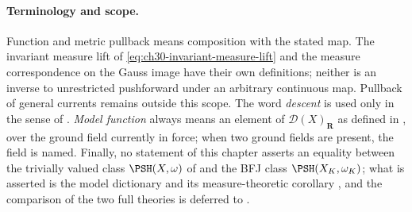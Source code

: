 \paragraph{Terminology and scope.}
Function and metric pullback means composition with the stated map.
The invariant measure lift of \eqref{eq:ch30-invariant-measure-lift}
and the measure correspondence on the Gauss image have their own
definitions; neither is an inverse to unrestricted pushforward under
an arbitrary continuous map.  Pullback of general currents remains
outside this scope.  The word \emph{descent} is used only in the sense of
.  \emph{Model function} always means an
element of $\mathcal D(X)_{\mathbf R}$ as defined in
, over the ground field currently in force;
when two ground fields are present, the field is named.  Finally, no
statement of this chapter asserts an equality between the trivially valued
class $\PSH(X,\omega)$ of  and the BFJ class
$\PSH(X_K,\omega_K)$; what is asserted is the model dictionary
 and its measure-theoretic corollary
, and the comparison of the two full theories
is deferred to .
